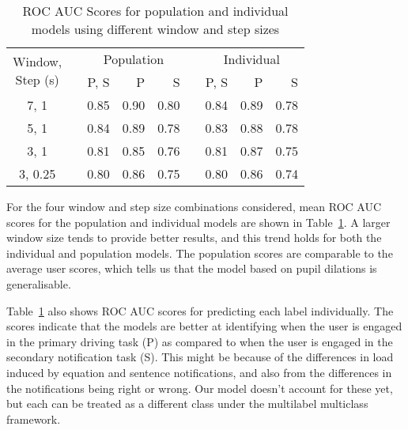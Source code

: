 \renewcommand{\arraystretch}{1.2}
\begin{table}[t]
\centering
\begin{tabular} {@{}ccrrrcrrr@{}}\toprule
\multirow{2}{*}{\parbox[c]{1.3cm}{\centering Window,\\Step (s)}} & \phantom{}
&  \multicolumn{3}{c}{Population} & \phantom{} & \multicolumn{3}{c}{Individual} \\
\cmidrule{3-5} \cmidrule{7-9}
 && P, S & P & S && P, S & P & S\\
\midrule
7, 1 && 0.85 & 0.90 & 0.80 && 0.84 & 0.89 & 0.78 \\
5, 1 && 0.84 & 0.89 & 0.78 && 0.83 & 0.88 & 0.78 \\
3, 1 && 0.81 & 0.85 & 0.76 && 0.81 & 0.87 & 0.75 \\
3, 0.25 && 0.80 & 0.86 & 0.75 && 0.80 & 0.86 & 0.74 \\
\bottomrule
\end{tabular}
\caption{ROC AUC Scores for population and individual models using different window and step sizes}
\label{Tab:win}
\end{table}

For the four window and step size combinations considered, mean ROC AUC scores for the population and individual models are shown in Table~\ref{Tab:win}. A larger window size tends to provide better results, and this trend holds for both the individual and population models. The population scores are comparable to the average user scores, which tells us that the model based on pupil dilations is generalisable. 

Table~\ref{Tab:win} also shows ROC AUC scores for predicting each label individually. The scores indicate that the models are better at identifying when the user is engaged in the primary driving task (P) as compared to when the user is engaged in the secondary notification task (S). This might be because of the differences in load induced by equation and sentence notifications, and also from the differences in the notifications being right or wrong. Our model doesn't account for these yet, but each can be treated as a different class under the multilabel multiclass framework.


